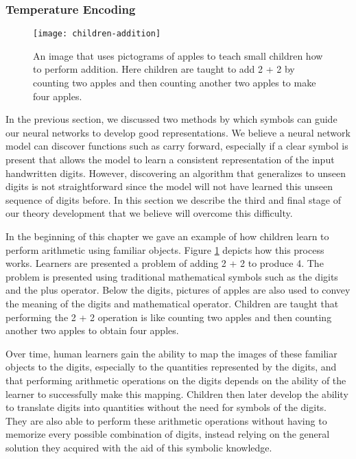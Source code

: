 \subsubsection{Temperature Encoding} \label{sec:theory-approach-methodology-temperature-encoding}

\begin{figure}[t]
	\centering
	\texttt{[image: children-addition]}
	\caption{An image that uses pictograms of apples to teach small children how to perform addition. Here children are taught to add 2 + 2 by counting two apples and then counting another two apples to make four apples\cite{learning_2015}.}
	\label{fig:children-addition}
\end{figure}

In the previous section, we discussed two methods by which symbols can guide our neural networks to develop good representations. We believe a neural network model can discover functions such as carry forward, especially if a clear symbol is present that allows the model to learn a consistent representation of the input handwritten digits. However, discovering an algorithm that generalizes to unseen digits is not straightforward since the model will not have learned this unseen sequence of digits before. In this section we describe the third and final stage of our theory development that we believe will overcome this difficulty.

In the beginning of this chapter we gave an example of how children learn to perform arithmetic using familiar objects. Figure \ref{fig:children-addition} depicts how this process works. Learners are presented a problem of adding 2 + 2 to produce 4. The problem is presented using traditional mathematical symbols such as the digits and the plus operator. Below the digits, pictures of apples are also used to convey the meaning of the digits and mathematical operator. Children are taught that performing the 2 + 2 operation is like counting two apples and then counting another two apples to obtain four apples.

Over time, human learners gain the ability to map the images of these familiar objects to the digits, especially to the quantities represented by the digits, and that performing arithmetic operations on the digits depends on the ability of the learner to successfully make this mapping. Children then later develop the ability to translate digits into quantities without the need for symbols of the digits. They are also able to perform these arithmetic operations without having to memorize every possible combination of digits, instead relying on the general solution they acquired with the aid of this symbolic knowledge.

